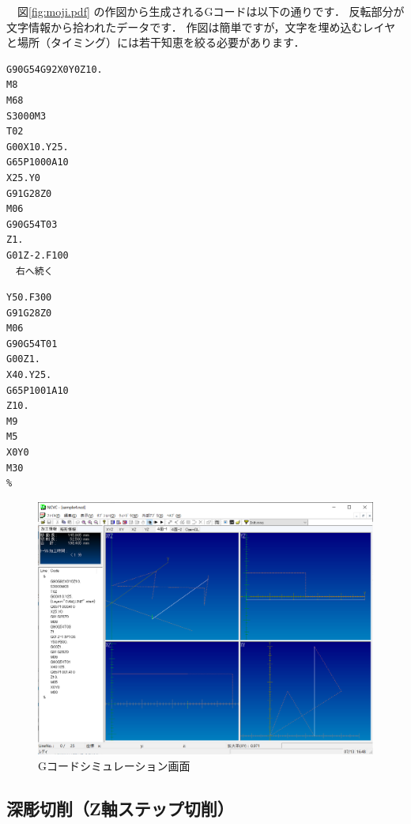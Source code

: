 　図\ref{fig:moji.pdf} の作図から生成されるGコードは以下の通りです．
反転部分が文字情報から拾われたデータです．
作図は簡単ですが，文字を埋め込むレイヤと場所（タイミング）には若干知恵を絞る必要があります．

\begin{minipage}[t]{0.5\textwidth}
\begin{lstlisting}[numbers=none,label=lst:moji.txt]
%
G90G54G92X0Y0Z10.
M8
M68
S3000M3
T02
G00X10.Y25.
G65P1000A10
X25.Y0
G91G28Z0
M06
G90G54T03
Z1.
G01Z-2.F100
　右へ続く
\end{lstlisting}
\end{minipage}
\begin{minipage}[t]{0.5\textwidth}
\begin{lstlisting}[numbers=none]
Y50.F300
G91G28Z0
M06
G90G54T01
G00Z1.
X40.Y25.
G65P1001A10
Z10.
M9
M5
X0Y0
M30
%
\end{lstlisting}
\end{minipage}

\begin{figure}[H]
\centering
\includegraphics[scale=0.55]{No3/fig/sample4.png}
\caption{Gコードシミュレーション画面}
\label{fig:sample4.png}
\end{figure}

\subsection{深彫切削（Z軸ステップ切削）}